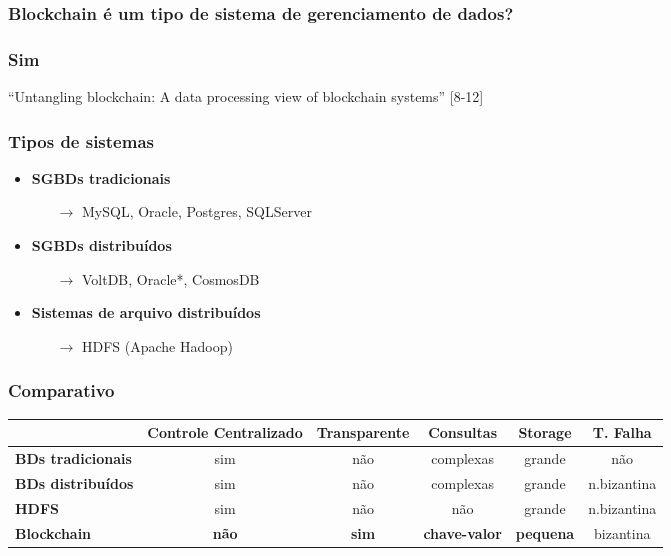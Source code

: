\documentclass{beamer}
\begin{document}
\begin{frame}
    \frametitle{Blockchain é um tipo de sistema de gerenciamento de dados?}
\end{frame}

\begin{frame}
    \frametitle{Sim}
    ``Untangling blockchain: A data processing view of blockchain systems''
    [8-12]
\end{frame}

\begin{frame}
 \frametitle{Tipos de sistemas}
 \begin{itemize}
     \item \textbf{SGBDs tradicionais}
        \begin{itemize}
            \item [$\rightarrow$] MySQL, Oracle, Postgres, SQLServer
        \end{itemize}
     \item \textbf{SGBDs distribuídos}
     \begin{itemize}
         \item [$\rightarrow$] VoltDB, Oracle*, CosmosDB
     \end{itemize}
    \item \textbf{Sistemas de arquivo distribuídos}
    \begin{itemize}
        \item [$\rightarrow$] HDFS (Apache Hadoop)
    \end{itemize}

 \end{itemize}
\end{frame}

\begin{frame}
\frametitle{Comparativo}
\centering
\begin{tabular}{@{}lccccc@{}}
\toprule
 & \textbf{Controle Centralizado} & \textbf{Transparente} & \textbf{Consultas}  & \textbf{Storage} & \textbf{T. Falha} \\ \midrule
\textbf{BDs tradicionais}   & sim               & não            & complexas & grande         & não            \\
\textbf{BDs distribuídos}  & sim               & não            & complexas & grande        & n.bizantina    \\
\textbf{HDFS}                & sim               & não            & não      & grande          & n.bizantina    \\ \midrule
\textbf{Blockchain}           & \textbf{não}               & \textbf{sim}            & \textbf{chave-valor}       & \textbf{pequena}         & bizantina  \\ \bottomrule
\end{tabular}
\end{frame}
\end{document}
